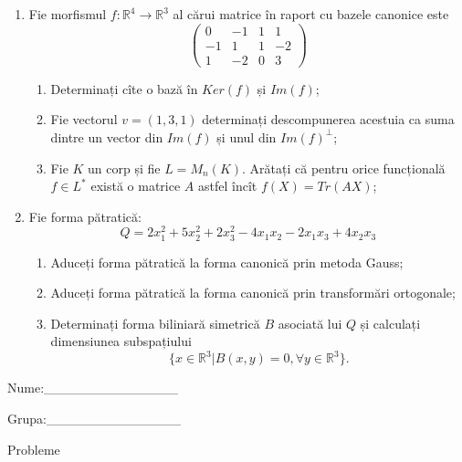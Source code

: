 \documentclass{article}
\begin{document}
\begin{enumerate}
 \item Fie morfismul $f:\mathbb{R}^4 \to \mathbb{R}^3$ al cărui matrice în raport cu bazele canonice este
$$\begin{pmatrix}
0&-1&1&1\\
-1&1&1&-2\\
1&-2&0&3
\end{pmatrix}$$

\begin{enumerate}
\item Determinați cîte o bază în $Ker(f)$ și $Im(f)$;
\item Fie vectorul $v=(1,3,1)$ determinați descompunerea acestuia ca suma dintre un vector din $Im(f)$ și unul din $Im(f)^\perp$;
\item Fie $K$ un corp și fie $L=M_n(K)$. Arătați că pentru orice funcțională $f \in L^*$ există o matrice $A$ astfel încît $f(X)=Tr(AX)$;
\end{enumerate}
\item Fie forma pătratică:
$$Q= 2x_1^2+5x_2^2+2x_3^2-4x_1x_2-2x_1x_3+4x_2x_3$$

\begin{enumerate}
\item Aduceți forma pătratică la forma canonică prin metoda Gauss;
\item Aduceți forma pătratică la forma canonică prin transformări ortogonale;
\item Determinați forma biliniară simetrică $B$ asociată lui $Q$ și calculați dimensiunea subspațiului
$$\{x \in \mathbb{R}^3 | B(x,y)=0,\forall y \in \mathbb{R}^3\}.$$

\end{enumerate}
\end{enumerate}
\newpage
\begin{flushright}
Nume:\_\_\_\_\_\_\_\_\_\_\_\_\_\_
 
 
Grupa:\_\_\_\_\_\_\_\_\_\_\_\_\_\_
\end{flushright}
\begin{center}
\vspace{2cm}
{\Large Probleme}
\vspace{2cm}
\end{center}
\end{document}
